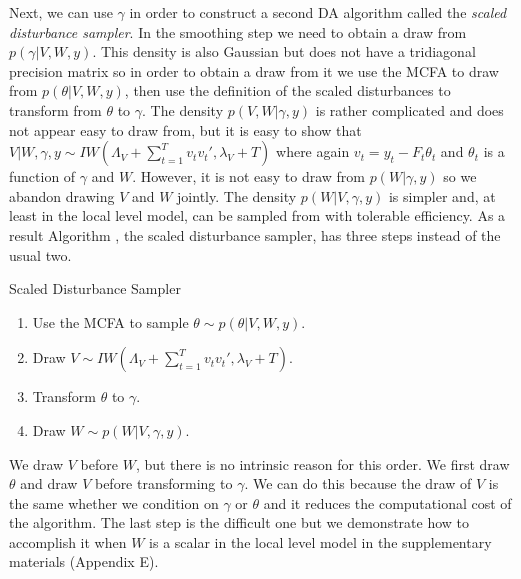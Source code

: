 \documentclass[12pt]{article}
\begin{document}
Next, we can use $\gamma$ in order to construct a second DA algorithm called the {\it scaled disturbance sampler}. In the smoothing step we need to obtain a draw from $p(\gamma|V,W,y)$. This density is also Gaussian but does not have a tridiagonal precision matrix so in order to obtain a draw from it we use the MCFA to draw from $p(\theta|V,W,y)$, then use the definition of the scaled disturbances to transform from $\theta$ to $\gamma$. The density $p(V,W|\gamma,y)$ is rather complicated and does not appear easy to draw from, but it is easy to show that $V|W,\gamma,y \sim IW\left(\Lambda_V + \sum_{t=1}^Tv_tv_t',\lambda_V + T\right)$ where again $v_t = y_t - F_t\theta_t$ and $\theta_t$ is a function of $\gamma$ and $W$. However, it is not easy to draw from $p(W|\gamma,y)$ so we abandon drawing $V$ and $W$ jointly. The density $p(W|V,\gamma,y)$ is simpler and, at least in the local level model, can be sampled from with tolerable efficiency. As a result Algorithm , the scaled disturbance sampler, has three steps instead of the usual two. 
\begin{alg*}[SD]Scaled Disturbance Sampler\label{alg:DLMdist}
\begin{enumerate}
\item Use the MCFA to sample $\theta \sim p(\theta|V,W,y)$.
\item Draw $V \sim IW\left(\Lambda_V + \sum_{t=1}^Tv_tv_t',\lambda_V + T\right)$.
\item Transform $\theta$ to $\gamma$.
\item Draw $W \sim p(W|V,\gamma,y)$.
\end{enumerate}
\end{alg*}\noindent
We draw $V$ before $W$, but there is no intrinsic reason for this order. We first draw $\theta$ and draw $V$ before transforming to $\gamma$. We can do this because the draw of $V$ is the same whether we condition on $\gamma$ or $\theta$ and it reduces the computational cost of the algorithm. The last step is the difficult one but we demonstrate how to accomplish it when $W$ is a scalar in the local level model in the supplementary materials (Appendix E).
\end{document}
